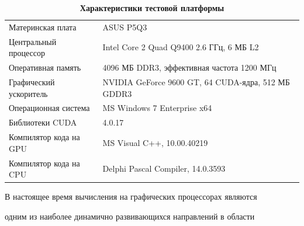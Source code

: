 \begin{table}[b!] \small \vspace{-5mm}

\centering \caption{\bf Характеристики тестовой платформы} \vspace{-3mm}

\begin{tabular}{ l | p{8cm} }

  \hline

      \rule{0mm}{12pt}%

    Материнская плата & ASUS P5Q3 \\

    \rule{0mm}{12pt}%

  Центральный процессор & Intel Core 2 Quad Q9400 2.6 ГГц, 6 МБ L2 \\

    \rule{0mm}{12pt}%

  Оперативная память & 4096 МБ DDR3, эффективная частота 1200 МГц \\

    \rule{0mm}{12pt}%

  Графический ускоритель & NVIDIA GeForce 9600 GT, 64 CUDA-ядра, 512 МБ GDDR3 \\

  \rule{0mm}{12pt}%

  Операционная система & MS Windows 7 Enterprise x64 \\

  \rule{0mm}{12pt}%

  Библиотеки CUDA & 4.0.17\\

  \rule{0mm}{12pt}%

  Компилятор кода на GPU & MS Visual C++, 10.00.40219\\

  \rule{0mm}{12pt}%

  Компилятор кода на CPU & Delphi Pascal Compiler, 14.0.3593 \\

\hline

\end{tabular}

\label{fertsev:tbl-config}

\end{table}





В настоящее время вычисления на графических процессорах являются

одним из наиболее динамично развивающихся направлений в области

